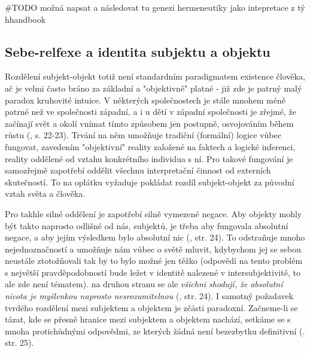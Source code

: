 \documentclass[11pt,a4paper]{article}
\begin{document}
#TODO možná napsat a následovat tu genezi hermeneutiky jako intepretace z tý hhandbook



\subsection{Sebe-relfexe a identita subjektu a objektu}

Rozdělení subjekt-objekt totiž není standardním paradigmatem existence člověka, ač je velmi často bráno za základní a "objektivně" platné - již zde je patrný malý paradox kruhovité intuice. V některých společnostech je stále mnohem méně patrné než ve společnosti západní, a i u dětí v západní společnosti je zřejmé, že začínají svět a okolí vnímat tímto způsobem jen postupně, osvojováním během růstu (\cite{kainz_paradox_1988}, s. 22-23). Trvání na něm umožňuje tradiční (formální) logice vůbec fungovat, zavedením "objektivní" reality založené na faktech a logické inferenci, reality oddělené od vztahu konkrétního individua s ní. Pro takové fungování je samozřejmě zapotřebí oddělit všechnu interpretační činnost od externích skutečností. To na oplátku vyžaduje pokládat rozdíl  subjekt-objekt za původní vztah světa a člověka. 

Pro takhle silné oddělení je zapotřebí silně vymezené negace. Aby objekty mohly být takto naprosto odlišné od nás, subjektů, je třeba aby fungovala absolutní negace, a aby jejím výsledkem bylo absolutní nic (\cite{kainz_paradox_1988}, str. 24). To odstraňuje mnoho nejednoznačností a umožňuje nám vůbec o světě mluvit, kdybychom jej se sebou neustále ztotožňovali tak by to bylo možné jen těžko (odpovědí na tento problém s největší pravděpodobností bude ležet v identitě nalezené v intersubjektivitě, to ale zde není tématem). na druhou stranu se ale \textit{všichni shodují, že absolutní nicota je myšlenkou naprosto nesrozumitelnou} (\cite{kainz_paradox_1988}, str. 24). I samotný požadavek tvrdého rozdělení mezi subjektem a objektem je zčásti paradoxní. Začneme-li se tázat, kde se přesně hranice mezi subjektem a objektem nachází, setkáme se s mnoha protichůdnými odpovědmi, ze kterých žádná není bezezbytku definitivní (\cite{kainz_paradox_1988}. str. 25). 
\end{document}
